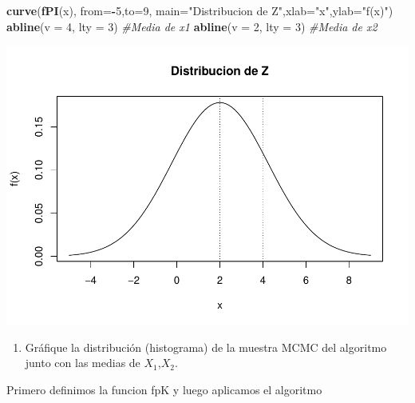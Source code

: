 \documentclass[
]{article}
\newenvironment{Shaded}{\begin{snugshade}}{\end{snugshade}}
\newcommand{\AttributeTok}[1]{\textcolor[rgb]{0.13,0.29,0.53}{#1}}
\newcommand{\CommentTok}[1]{\textcolor[rgb]{0.56,0.35,0.01}{\textit{#1}}}
\newcommand{\DecValTok}[1]{\textcolor[rgb]{0.00,0.00,0.81}{#1}}
\newcommand{\FunctionTok}[1]{\textcolor[rgb]{0.13,0.29,0.53}{\textbf{#1}}}
\newcommand{\NormalTok}[1]{#1}
\newcommand{\SpecialCharTok}[1]{\textcolor[rgb]{0.81,0.36,0.00}{\textbf{#1}}}
\newcommand{\StringTok}[1]{\textcolor[rgb]{0.31,0.60,0.02}{#1}}
\providecommand{\tightlist}{%
  \setlength{\itemsep}{0pt}\setlength{\parskip}{0pt}}
\begin{document}
\begin{Shaded}
\begin{Highlighting}[]
\FunctionTok{curve}\NormalTok{(}\FunctionTok{fPI}\NormalTok{(x), }\AttributeTok{from=}\SpecialCharTok{{-}}\DecValTok{5}\NormalTok{,}\AttributeTok{to=}\DecValTok{9}\NormalTok{, }\AttributeTok{main=}\StringTok{"Distribucion de Z"}\NormalTok{,}\AttributeTok{xlab=}\StringTok{"x"}\NormalTok{,}\AttributeTok{ylab=}\StringTok{"f(x)"}\NormalTok{)}
\FunctionTok{abline}\NormalTok{(}\AttributeTok{v =} \DecValTok{4}\NormalTok{, }\AttributeTok{lty =} \DecValTok{3}\NormalTok{) }\CommentTok{\#Media de x1}
\FunctionTok{abline}\NormalTok{(}\AttributeTok{v =} \DecValTok{2}\NormalTok{, }\AttributeTok{lty =} \DecValTok{3}\NormalTok{) }\CommentTok{\#Media de x2}
\end{Highlighting}
\end{Shaded}

\includegraphics{tarea2_files/figure-latex/unnamed-chunk-12-1.pdf}

\begin{enumerate}
\def\labelenumi{\alph{enumi}.}
\setcounter{enumi}{1}
\tightlist
\item
  Gráfique la distribución (histograma) de la muestra MCMC del algoritmo
  junto con las medias de \(𝑋_1\),\(𝑋_2\).
\end{enumerate}

Primero definimos la funcion fpK y luego aplicamos el algoritmo
\end{document}
